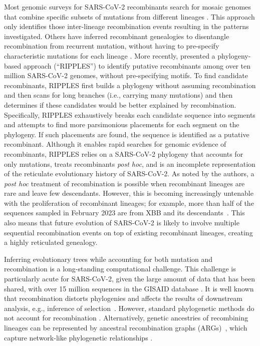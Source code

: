\documentclass{article}
\begin{document}
Most genomic surveys for SARS-CoV-2 recombinants search for mosaic genomes that combine specific subsets of mutations from different lineages \citep[e.g.][]{VanInsberghe2021-eu,Jackson2021-ik,Wertheim2022-hj,Sekizuka2022-xz}. This approach only identifies those inter-lineage recombination events resulting in the patterns investigated. Others have inferred recombinant genealogies to disentangle recombination from recurrent mutation, without having to pre-specify characteristic mutations for each lineage \citep{Ignatieva2021-rg}. More recently, \cite{Turakhia2022-it} presented a phylogeny-based approach (``RIPPLES'') to identify putative recombinants among over ten million SARS-CoV-2 genomes, without pre-specifying motifs. To find candidate recombinants, RIPPLES first builds a phylogeny without assuming recombination and then scans for long branches (i.e., carrying many mutations) and then determines if these candidates would be better explained by recombination. Specifically, RIPPLES exhaustively breaks each candidate sequence into segments and attempts to find more parsimonious placements for each segment on the phylogeny. If such placements are found, the sequence is identified as a putative recombinant. Although it enables rapid searches for genomic evidence of recombinants, RIPPLES relies on a SARS-CoV-2 phylogeny that accounts for only mutations, treats recombinants \textit{post hoc}, and is an incomplete representation of the reticulate evolutionary history of SARS-CoV-2. As noted by the authors, a \textit{post hoc} treatment of recombination is possible when recombinant lineages are rare and leave few descendants. However, this is becoming increasingly untenable with the proliferation of recombinant lineages; for example, more than half of the sequences sampled in February 2023 are from XBB and its descendants~\citep{Chen2022-pz}. This also means that future evolution of SARS-CoV-2 is likely to involve multiple sequential recombination events on top of existing recombinant lineages, creating a highly reticulated genealogy.

Inferring evolutionary trees while accounting for both mutation and recombination is a long-standing computational challenge. This challenge is particularly acute for SARS-CoV-2, given the large amount of data that has been shared, with over 15 million sequences in the GISAID database \citep{Shu2017-hp}. It is well known that recombination distorts phylogenies \citep{Schierup2000-fg} and affects the results of downstream analysis, e.g., inference of selection~\citep{Anisimova2003-vr}. However, standard phylogenetic methods do not account for recombination \citep[e.g.][]{Ronquist2012-zw,Minh2020-lr,Guindon2003-zd}. Alternatively, genetic ancestries of recombining lineages can be represented by ancestral recombination graphs (ARGs)~\citep{Griffiths1981-lw,Hudson1983-if}, which capture network-like phylogenetic relationships \citep{Gusfield2014-qw}.
\end{document}
